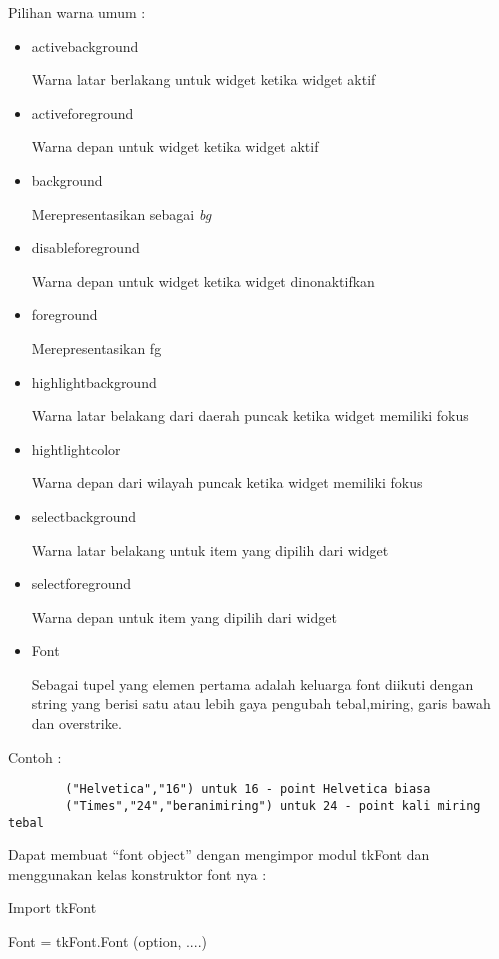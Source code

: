 \documentclass [12pt,a4paper,notitlepage,oneside,bahasa]{article}
\begin{document}
\vspace{12pt}
Pilihan warna umum :
\noindent 
\begin{itemize}
	\item activebackground \par
	Warna latar berlakang untuk widget ketika widget aktif \par
	\noindent 
	\item activeforeground \par
	Warna depan untuk widget ketika widget aktif \par
	\noindent 
	\item background \par
	Merepresentasikan sebagai \textit{bg} \par
	\noindent 
	\item disableforeground \par
	Warna depan untuk widget ketika widget dinonaktifkan \par
	\noindent 
	\item foreground \par
	Merepresentasikan fg \par
	\noindent 
	\item highlightbackground \par
	Warna latar belakang dari daerah puncak ketika widget memiliki fokus \par
	\noindent 
	\item hightlightcolor \par
	Warna depan dari wilayah puncak ketika widget memiliki fokus \par
	\noindent 
	\item selectbackground \par
	Warna latar belakang untuk item yang dipilih dari widget \par
	\noindent 
	\item selectforeground \par
	Warna depan untuk item yang dipilih dari widget \par
	\noindent 
	\item Font \par
	\noindent 
	Sebagai tupel yang elemen pertama adalah keluarga font diikuti dengan string yang berisi satu atau lebih gaya pengubah tebal,miring, garis bawah dan overstrike. 
\end{itemize}
	\noindent 
Contoh : \par
	\begin{verbatim}
		("Helvetica","16") untuk 16 - point Helvetica biasa
		("Times","24","beranimiring") untuk 24 - point kali miring tebal
	\end{verbatim}
 		\par
\vspace{12pt}
Dapat membuat  ``font object'' dengan mengimpor modul tkFont dan menggunakan kelas konstruktor font nya : \par
Import tkFont \par
Font = tkFont.Font (option, ....) \par
\end{document}
